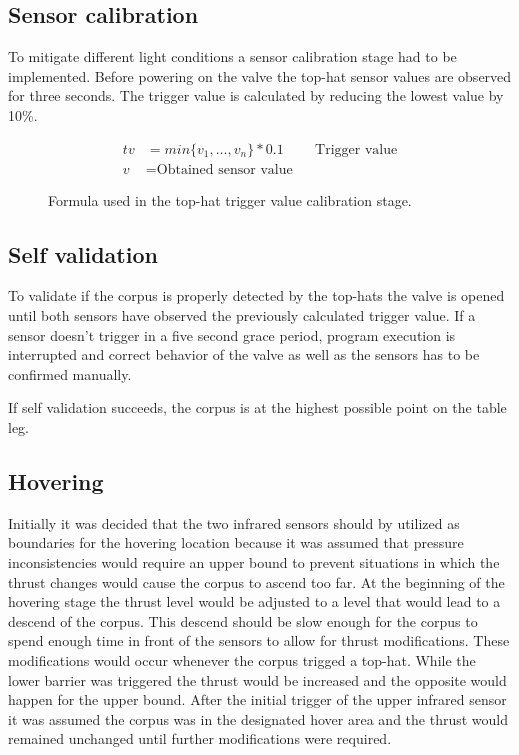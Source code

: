\subsection{Sensor calibration}
To mitigate different light conditions a sensor calibration stage had to be implemented. Before powering on the valve the top-hat sensor values are observed for three seconds. The trigger value is calculated by reducing the lowest value by 10\%.
\begin{figure}[h]
\begin{align*}
    tv &=min\{v_1, \dots, v_n\} * 0.1 && \text{Trigger value} \\
    v &= \text{Obtained sensor value}
\end{align*}
\caption{Formula used in the top-hat trigger value calibration stage.}
\end{figure}

\subsection{Self validation}
To validate if the corpus is properly detected by the top-hats the valve is opened until both sensors have observed the previously calculated trigger value. If a sensor doesn't trigger in a five second grace period, program execution is interrupted and correct behavior of the valve as well as the sensors has to be confirmed manually.

If self validation succeeds, the corpus is at the highest possible point on the table leg.

\subsection{Hovering}
Initially it was decided that the two infrared sensors should by utilized as boundaries for the hovering location because it was assumed that pressure inconsistencies would require an upper bound to prevent situations in which the thrust changes would cause the corpus to ascend too far. 
At the beginning of the hovering stage the thrust level would be adjusted to a level that would lead to a descend of the corpus. This descend should be slow enough for the corpus to spend enough time in front of the sensors to allow for thrust modifications.
These modifications would occur whenever the corpus trigged a top-hat. While the lower barrier was triggered the thrust would be increased and the opposite would happen for the upper bound. After the initial trigger of the upper infrared sensor it was assumed the corpus was in the designated hover area and the thrust would remained unchanged until further modifications were required.

